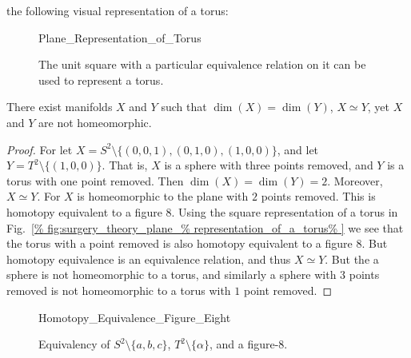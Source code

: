 \documentclass[crop=false,class=book,oneside]{standalone}
\begin{document}
            the following visual representation of a torus:
            \begin{figure}[H]
                \centering
                \captionsetup{type=figure}
                
                          {Plane_Representation_of_Torus}
                \caption[Plane Representation of a Torus]
                        {The unit square with a particular
                         equivalence relation on it can be
                         used to represent a torus.}
                \label{fig:surgery_theory_plane_%
                       representation_of_a_torus}
            \end{figure}
            \begin{theorem}
                There exist manifolds $X$ and $Y$ such that
                $\dim(X)=\dim(Y)$, ${X}\simeq{Y}$,
                yet $X$ and $Y$ are not homeomorphic.
            \end{theorem}
            \begin{proof}
                For let
                $X=S^{2}\setminus\{(0,0,1),(0,1,0),(1,0,0)\}$,
                and let
                $Y=T^{2}\setminus\{(1,0,0)\}$.
                That is, $X$ is a sphere with three points removed,
                and $Y$ is a torus with one point removed. Then
                $\dim(X)=\dim(Y)=2$.
                Moreover, $X\simeq Y$. For $X$ is homeomorphic
                to the plane with $2$ points removed. This is
                homotopy equivalent to a figure $8$.
                Using the square representation of a torus in
                Fig.~\ref{%
                    fig:surgery_theory_plane_%
                    representation_of_a_torus%
                }
                we see that the torus with a point removed
                is also homotopy equivalent to a figure $8$.
                But homotopy equivalence is an equivalence
                relation, and thus $X\simeq Y$. But the a sphere
                is not homeomorphic to a torus, and similarly a
                sphere with $3$ points removed is not homeomorphic
                to a torus with $1$ point removed.
            \end{proof}
            \begin{figure}[H]
                    \centering
                    \captionsetup{type=figure}
                    
                              {Homotopy_Equivalence_Figure_Eight}
                    \caption{Equivalency of $S^{2}\setminus\{a,b,c\}$,
                             $T^{2}\setminus\{\alpha\}$, and a figure-8.}
                    \label{fig:surgery_theory_homotopy_equivalence_%
                           sphere_with_3_holes_torus_with_1_hole}
            \end{figure} 
\end{document}
